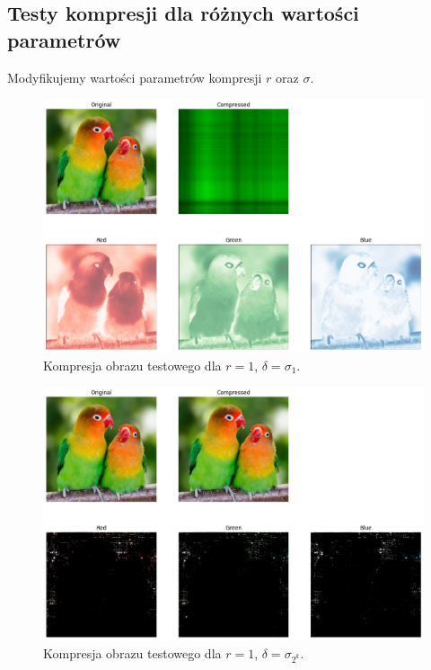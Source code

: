 \documentclass[11pt, leqno]{scrartcl}
\begin{document}
    \subsection{Testy kompresji dla różnych wartości parametrów}
    Modyfikujemy wartości parametrów kompresji $r$ oraz $\sigma$.
    \begin{figure}[H]
        \centering
        \includegraphics[width=0.9\linewidth]{r1sigma1.png}
        \caption{Kompresja obrazu testowego dla $r=1$, $\delta =\sigma_1$.}
    \end{figure}
    \begin{figure}[H]
        \centering
        \includegraphics[width=0.9\linewidth]{r1sigma2k.png}
        \caption{Kompresja obrazu testowego dla $r=1$, $\delta =\sigma_{2^k}$.}
    \end{figure}
\end{document}
